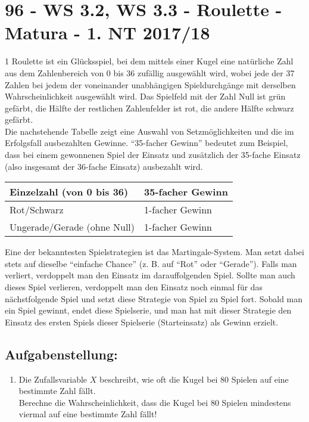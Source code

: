 \section{96 - WS 3.2, WS 3.3 - Roulette - Matura - 1. NT 2017/18}

\begin{langesbeispiel} \item[1] %
Roulette ist ein Glücksspiel, bei dem mittels einer Kugel eine natürliche Zahl aus dem Zahlenbereich von 0 bis 36 zufällig ausgewählt wird, wobei jede der 37 Zahlen bei jedem der voneinander unabhängigen Spieldurchgänge mit derselben Wahrscheinlichkeit ausgewählt wird. Das Spielfeld mit der Zahl Null ist grün gefärbt, die Hälfte der restlichen Zahlenfelder ist rot, die andere Hälfte schwarz gefärbt.\\
Die nachstehende Tabelle zeigt eine Auswahl von Setzmöglichkeiten und die im Erfolgsfall ausbezahlten Gewinne. "`35-facher Gewinn"' bedeutet zum Beispiel, dass bei einem gewonnenen Spiel der Einsatz und zusätzlich der 35-fache Einsatz (also insgesamt der 36-fache Einsatz) ausbezahlt wird.

\begin{center}
	\begin{tabular}{|l|l|}\hline
	\cellcolor[gray]{0.9}Einzelzahl (von 0 bis 36)&35-facher Gewinn\\ \hline
	\cellcolor[gray]{0.9}Rot/Schwarz&1-facher Gewinn\\ \hline
	\cellcolor[gray]{0.9}Ungerade/Gerade (ohne Null)&1-facher Gewinn\\ \hline
	\end{tabular}
\end{center}

Eine der bekanntesten Spielstrategien ist das Martingale-System. Man setzt dabei stets auf dieselbe "`einfache Chance"' (z. B. auf "`Rot"' oder "`Gerade"'). Falls man verliert, verdoppelt man den Einsatz im darauffolgenden Spiel. Sollte man auch dieses Spiel verlieren, verdoppelt man den Einsatz noch einmal für das nächstfolgende Spiel und setzt diese Strategie von Spiel zu Spiel fort. Sobald man ein Spiel gewinnt, endet diese Spielserie, und man hat mit dieser Strategie den Einsatz des ersten Spiels dieser Spielserie (Starteinsatz) als Gewinn erzielt.

\subsection{Aufgabenstellung:}
\begin{enumerate}
	\item Die Zufallsvariable $X$ beschreibt, wie oft die Kugel bei 80 Spielen auf eine bestimmte Zahl fällt.\\
	Berechne die Wahrscheinlichkeit, dass die Kugel bei 80 Spielen mindestens viermal auf eine bestimmte Zahl fällt!
	

\end{enumerate}
\end{langesbeispiel}
